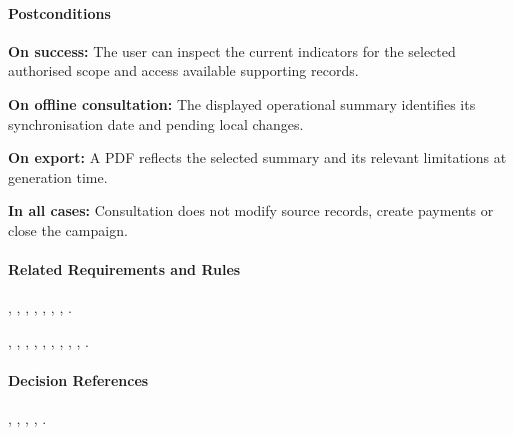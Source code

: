 \paragraph{Postconditions}

\textbf{On success:}
The user can inspect the current indicators
for the selected authorised scope
and access available supporting records.

\textbf{On offline consultation:}
The displayed operational summary identifies
its synchronisation date and pending local changes.

\textbf{On export:}
A PDF reflects the selected summary
and its relevant limitations at generation time.

\textbf{In all cases:}
Consultation does not modify source records,
create payments or close the campaign.

\paragraph{Related Requirements and Rules}
\hyperref[fr:055]{}, \hyperref[fr:056]{}, \hyperref[fr:057]{}, \hyperref[fr:058]{}, \hyperref[fr:059]{}, \hyperref[fr:060]{}, \hyperref[fr:061]{}, \hyperref[fr:062]{}.

\hyperref[br:014]{}, \hyperref[br:018]{}, \hyperref[br:019]{}, \hyperref[br:020]{}, \hyperref[br:035]{}, \hyperref[br:036]{}, \hyperref[br:037]{}, \hyperref[br:038]{}, \hyperref[br:039]{}, \hyperref[br:040]{}.

\paragraph{Decision References}
, , , , .
